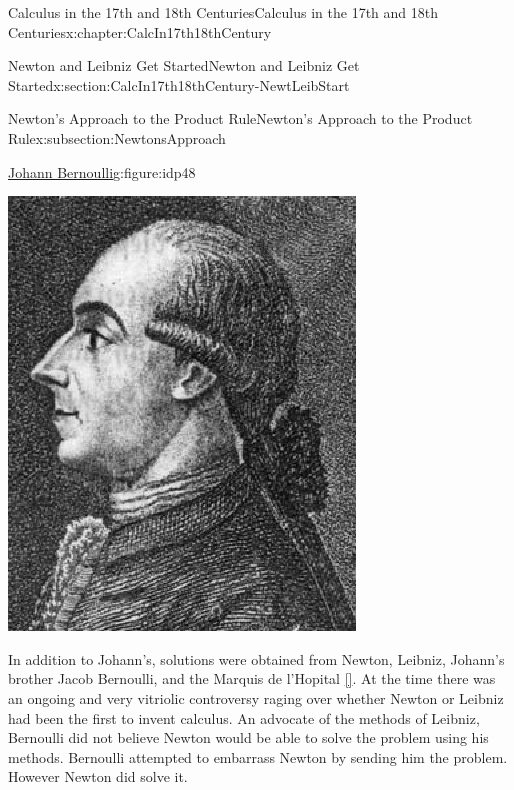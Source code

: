 \begin{chapterptx}{Calculus in the 17th and 18th Centuries}{}{Calculus in the 17th and 18th Centuries}{}{}{x:chapter:CalcIn17th18thCentury}
\begin{sectionptx}{Newton and Leibniz Get Started}{}{Newton and Leibniz Get Started}{}{}{x:section:CalcIn17th18thCentury-NewtLeibStart}
\begin{subsectionptx}{Newton's Approach to the Product Rule}{}{Newton's Approach to the Product Rule}{}{}{x:subsection:NewtonsApproach}
\begin{figureptx}{\href{https://mathshistory.st-andrews.ac.uk/Biographies/Bernoulli_Johann/}{Johann Bernoulli}\protect\footnotemark{}}{g:figure:idp48}{}
\begin{image}{0.325}{0.35}{0.325}
					\includegraphics[width=\linewidth]{external/images/BernoulliJohann.png}
				\end{image}%
				\tcblower
			\end{figureptx}%
			In addition to Johann's, solutions were obtained from Newton,  Leibniz, Johann's brother Jacob Bernoulli,  and the Marquis de l'Hopital \hyperlink{x:biblio:struik69__sourc_book_mathem}{[{}]}.  At the time there was an ongoing and very vitriolic controversy raging over whether Newton or Leibniz had been the first to invent calculus.  An advocate of the methods of Leibniz, Bernoulli did not believe Newton would be able to solve the problem using his methods. Bernoulli attempted to embarrass Newton by sending him the problem.  However Newton did solve it.%
			\par

\end{subsectionptx}
\end{sectionptx}
\end{chapterptx}
